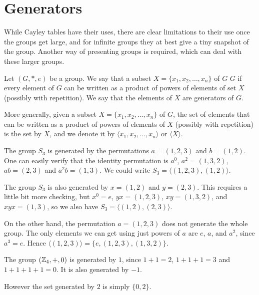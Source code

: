 \section{Generators}

While Cayley tables have their uses, there are clear limitations to their use
once the groups get large, and for infinite groups they at best give a tiny
snapshot of the group.  Another way of presenting groups is required, which
can deal with these larger groups.

\begin{definition}
  Let $(G, \ast, e)$ be a group.  We say that a subset $X = \{x_{1}, x_{2}, \ldots,
  x_{n}\}$ of $G$  $G$ if every element of $G$ can be
  written as a product of powers of elements of set $X$ (possibly with
  repetition).  We say that the elements of $X$ are generators of $G$.
  
  More generally, given a subset $X = \{x_{1}, x_{2}, \ldots, x_{n}\}$ of $G$, the
  set of elements that can be written as a product of powers of elements of $X$
  (possibly with repetition) is the set  by $X$,
  and we denote it by $\langle x_{1}, x_{2}, \ldots, x_{n} \rangle$ or
  $\langle X \rangle$.
\end{definition}

\begin{example}
  The group $S_{3}$ is generated by the permutations $a = (1,2,3)$ and
  $b = (1,2)$.  One can easily verify that the identity permutation is $a^{0}$,
  $a^{2} = (1,3,2)$, $ab = (2,3)$ and $a^{2}b = (1,3)$.  We could write
  $S_{3} = \langle (1,2,3), (1,2) \rangle$.
  
  The group $S_{3}$ is also generated by $x = (1,2)$ and $y = (2,3)$.  This
  requires a little bit more checking, but $x^{0} = e$, $yx = (1,2,3)$,
  $xy = (1,3,2)$, and $xyx = (1,3)$, so we also have $S_{3} = \langle (1,2),
  (2,3) \rangle$.
  
  On the other hand, the permutation $a = (1,2,3)$ does not generate the
  whole group. The only elements we can get using just powers of $a$ are
  $e$, $a$, and $a^{2}$, since $a^{3} = e$.
  Hence $\langle (1,2,3) \rangle = \{ e, (1,2,3), (1,3,2) \}$.
\end{example}

\begin{example}
  The group $(\mathbb{Z}_{4}, +, 0)$ is generated by $1$, since $1+1 = 2$,
  $1 + 1 + 1 = 3$ and $1 + 1 + 1 + 1 = 0$.  It is also generated by $-1$.
  
  However the set generated by $2$ is simply $\{0, 2\}$.
\end{example}

